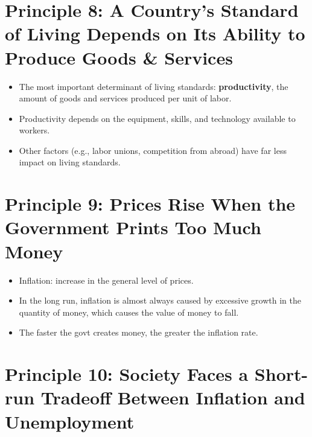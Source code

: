 \documentclass[
]{book}
\providecommand{\tightlist}{%
  \setlength{\itemsep}{0pt}\setlength{\parskip}{0pt}}
\begin{document}
\hypertarget{principle-8-a-countrys-standard-of-living-depends-on-its-ability-to-produce-goods-services}{%
\section{Principle 8: A Country's Standard of Living Depends on Its Ability to Produce Goods \& Services}\label{principle-8-a-countrys-standard-of-living-depends-on-its-ability-to-produce-goods-services}}

\begin{itemize}
\tightlist
\item
  The most important determinant of living standards: \textbf{productivity}, the amount of goods and services produced per unit of labor.
\item
  Productivity depends on the equipment, skills, and technology available to workers.
\item
  Other factors (e.g., labor unions, competition from abroad) have far less impact on living standards.
\end{itemize}

\hypertarget{principle-9-prices-rise-when-the-government-prints-too-much-money}{%
\section{Principle 9: Prices Rise When the Government Prints Too Much Money}\label{principle-9-prices-rise-when-the-government-prints-too-much-money}}

\begin{itemize}
\tightlist
\item
  Inflation: increase in the general level of prices.
\item
  In the long run, inflation is almost always caused by excessive growth in the quantity of money, which causes the value of money to fall.
\item
  The faster the govt creates money, the greater the inflation rate.
\end{itemize}

\hypertarget{society-faces-a-short-run-tradeoff-between-inflation-and-unemployment}{%
\section{\texorpdfstring{\textbf{Principle 10:} Society Faces a Short-run Tradeoff Between Inflation and Unemployment}{ Society Faces a Short-run Tradeoff Between Inflation and Unemployment}}\label{society-faces-a-short-run-tradeoff-between-inflation-and-unemployment}}
\end{document}
